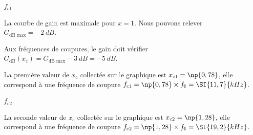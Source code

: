 
\begin{enonce}
	$f_{\text{c1}}$ 
\end{enonce}


\begin{corrige}
	La courbe de gain est maximale pour $x=1$. Nous pouvons relever $G_{ \text{dB max} } = \SI{-2}{dB}$.

	Aux fréquences de coupures, le gain doit vérifier $G_{\text{dB}}(x_{\text{c}})=G_{ \text{dB max} } - \SI{3}{dB} = \SI{-5}{dB}.$

	La première valeur  de $x_{\text{c}}$ collectée sur le graphique est $x_{\text{c1}}=\np{0,78}$, elle correspond à une fréquence de coupure $f_{\text{c1}} = \np{0,78} \times f_0 = \SI{11,7}{kHz}$.
\end{corrige}

\begin{enonce}
	$f_{\text{c2}}$ 
\end{enonce}


\begin{corrige}
	La seconde valeur  de $x_{\text{c}}$ collectée sur le graphique est $x_{\text{c2}}=\np{1,28}$, elle correspond à une fréquence de coupure $f_{\text{c2}} = \np{1,28} \times f_0 = \SI{19,2}{kHz}$.
\end{corrige}

\finEntrainement



